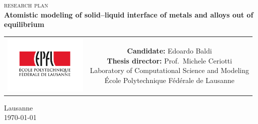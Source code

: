 \begin{titlepage}
\begin{center}

\begingroup
\sffamily
\null\vspace{2cm}
{\Huge\scshape research plan} \\[12pt]
{\huge\bfseries Atomistic modeling of solid--liquid interface of metals and alloys out of equilibrium \\[24pt]} 
    
\vspace{4cm}
\begin{tabular}{cc}
\parbox{0.3\textwidth}{\includegraphics[angle=-90,width=4cm]{Images/epfl}}
&
\parbox{0.7\textwidth}{%
%
    {\bfseries Candidate:} Edoardo Baldi\\
    {\bfseries Thesis director:} Prof.~Michele Ceriotti\\[6pt]
%
    Laboratory of Computational Science and Modeling\\
	École Polytechnique Fédérale de Lausanne\\[6pt]
%
%
}
\end{tabular}
\vfill
{Lausanne \\ \today}
\endgroup
\end{center}
\end{titlepage}